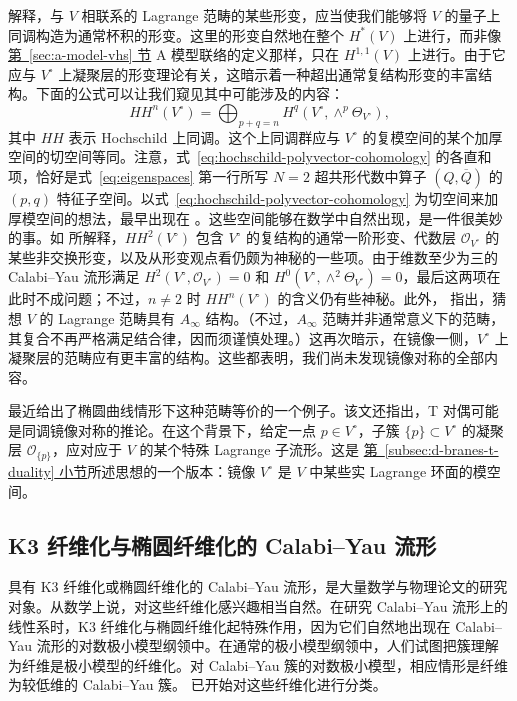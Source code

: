  解释，与 $V$ 相联系的 Lagrange 范畴的某些形变，应当使我们能够将 $V$ 的量子上同调构造为通常杯积的形变。这里的形变自然地在整个 $H^*(V)$ 上进行，而非像\hyperref[sec:a-model-vhs]{第~\ref*{sec:a-model-vhs} 节} A 模型联络的定义那样，只在 $H^{1,1}(V)$ 上进行。由于它应与 $V^\circ$ 上凝聚层的形变理论有关，这暗示着一种超出通常复结构形变的丰富结构。下面的公式可以让我们窥见其中可能涉及的内容：
\begin{equation}\label{eq:hochschild-polyvector-cohomology}
HH^n(V^\circ)=\bigoplus_{p+q=n}H^q(V^\circ,\wedge^p\Theta_{V^\circ}),
\end{equation}
其中 $HH$ 表示 Hochschild 上同调。这个上同调群应与 $V^\circ$ 的复模空间的某个加厚空间的切空间等同。注意，式~\eqref{eq:hochschild-polyvector-cohomology} 的各直和项，恰好是式~\eqref{eq:eigenspaces} 第一行所写 $N=2$ 超共形代数中算子 $(Q,\overline Q)$ 的 $(p,q)$ 特征子空间。以式~\eqref{eq:hochschild-polyvector-cohomology} 为切空间来加厚模空间的想法，最早出现在 。这些空间能够在数学中自然出现，是一件很美妙的事。如  所解释，$HH^2(V^\circ)$ 包含 $V^\circ$ 的复结构的通常一阶形变、代数层 $\mathcal O_{V^\circ}$ 的某些非交换形变，以及从形变观点看仍颇为神秘的一些项。由于维数至少为三的 Calabi--Yau 流形满足 $H^2(V^\circ,\mathcal O_{V^\circ})=0$ 和 $H^0(V^\circ,\wedge^2\Theta_{V^\circ})=0$，最后这两项在此时不成问题；不过，$n\ne2$ 时 $HH^n(V^\circ)$ 的含义仍有些神秘。此外， 指出，猜想 $V$ 的 Lagrange 范畴具有 $A_\infty$ 结构。（不过，$A_\infty$ 范畴并非通常意义下的范畴，其复合不再严格满足结合律，因而须谨慎处理。）这再次暗示，在镜像一侧，$V^\circ$ 上凝聚层的范畴应有更丰富的结构。这些都表明，我们尚未发现镜像对称的全部内容。

 最近给出了椭圆曲线情形下这种范畴等价的一个例子。该文还指出，T 对偶可能是同调镜像对称的推论。在这个背景下，给定一点 $p\in V^\circ$，子簇 $\{p\}\subset V^\circ$ 的凝聚层 $\mathcal O_{\{p\}}$，应对应于 $V$ 的某个特殊 Lagrange 子流形。这是
\hyperref[subsec:d-branes-t-duality]{第~\ref*{subsec:d-branes-t-duality} 小节}所述思想的一个版本：镜像 $V^\circ$ 是 $V$ 中某些实 Lagrange 环面的模空间。

\subsection{K3 纤维化与椭圆纤维化的 Calabi--Yau 流形}\label{subsec:k3-elliptic-fibered-cy}
具有 K3 纤维化或椭圆纤维化的 Calabi--Yau 流形，是大量数学与物理论文的研究对象。从数学上说，对这些纤维化感兴趣相当自然。在研究 Calabi--Yau 流形上的线性系时，K3 纤维化与椭圆纤维化起特殊作用，因为它们自然地出现在 Calabi--Yau 流形的对数极小模型纲领中。在通常的极小模型纲领中，人们试图把簇理解为纤维是极小模型的纤维化。对 Calabi--Yau 簇的对数极小模型，相应情形是纤维为较低维的 Calabi--Yau 簇。 已开始对这些纤维化进行分类。

